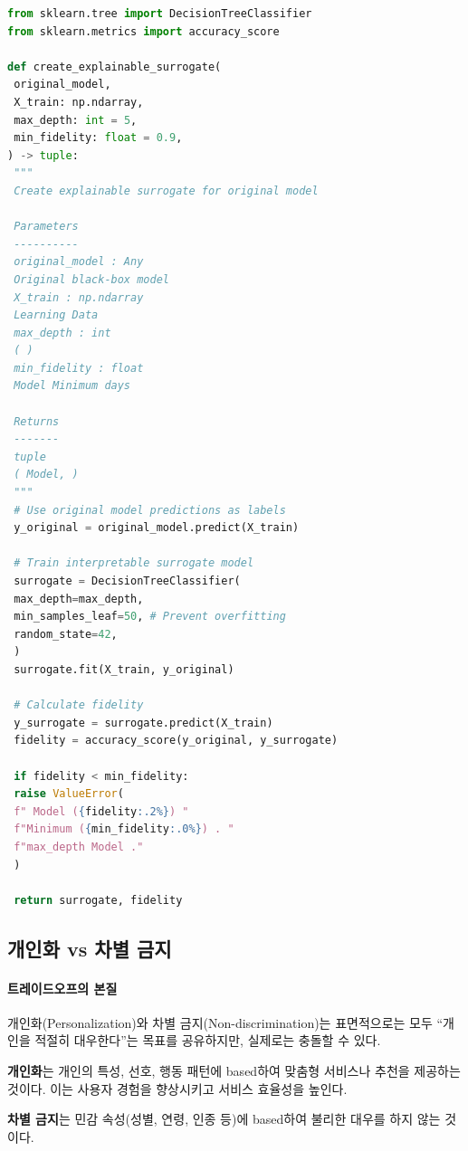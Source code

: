 \begin{lstlisting}[language=Python, caption={Generating Surrogate Model for Explanation}, label={lst:surrogate_model}]
from sklearn.tree import DecisionTreeClassifier
from sklearn.metrics import accuracy_score

def create_explainable_surrogate(
 original_model,
 X_train: np.ndarray,
 max_depth: int = 5,
 min_fidelity: float = 0.9,
) -> tuple:
 """
 Create explainable surrogate for original model
 
 Parameters
 ----------
 original_model : Any
 Original black-box model
 X_train : np.ndarray
 Learning Data
 max_depth : int
 ( )
 min_fidelity : float
 Model Minimum days 
 
 Returns
 -------
 tuple
 ( Model, )
 """
 # Use original model predictions as labels
 y_original = original_model.predict(X_train)
 
 # Train interpretable surrogate model
 surrogate = DecisionTreeClassifier(
 max_depth=max_depth,
 min_samples_leaf=50, # Prevent overfitting
 random_state=42,
 )
 surrogate.fit(X_train, y_original)
 
 # Calculate fidelity
 y_surrogate = surrogate.predict(X_train)
 fidelity = accuracy_score(y_original, y_surrogate)
 
 if fidelity < min_fidelity:
 raise ValueError(
 f" Model ({fidelity:.2%}) "
 f"Minimum ({min_fidelity:.0%}) . "
 f"max_depth Model ."
 )
 
 return surrogate, fidelity
\end{lstlisting}


\subsection{개인화 vs 차별 금지}
\label{sec:3.2.3}

\paragraph{트레이드오프의 본질}

개인화(Personalization)와 차별 금지(Non-discrimination)는 
표면적으로는 모두 ``개인을 적절히 대우한다''는 목표를 공유하지만, 
실제로는 충돌할 수 있다.

\textbf{개인화}는 개인의 특성, 선호, 행동 패턴에 based하여 
맞춤형 서비스나 추천을 제공하는 것이다. 
이는 사용자 경험을 향상시키고 서비스 효율성을 높인다.

\textbf{차별 금지}는 민감 속성(성별, 연령, 인종 등)에 based하여 
불리한 대우를 하지 않는 것이다.

